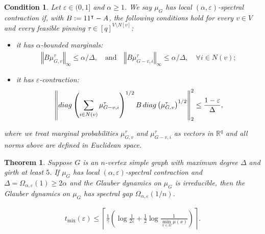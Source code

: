 \documentclass[10pt,a4paper]{amsart}
\newtheorem{theorem}{Theorem}
\newtheorem{condition}{Condition}
\renewcommand{\epsilon}{\varepsilon}
\newcommand{\norm}[1]{\left\Vert#1\right\Vert}
\newcommand{\tp}{\tuple}
\newcommand{\tuple}[1]{\left(#1\right)}
\begin{document}
\begin{condition}\label{cond-local-spectral-contraction}
  Let $\epsilon \in (0,1]$ and $\alpha \geq 1$.
  We say $\mu_G$ has \emph{local $(\alpha,\epsilon)$-spectral contraction} if, with $B := \*1\*1^\intercal - A$, the following conditions hold for every $v \in V$ and every feasible pinning $\tau \in [q]^{V\setminus N[v]}$:
  \begin{itemize}
  \item it has \emph{$\alpha$-bounded marginals}:
    \begin{align*}
      \norm{B\mu^\tau_{G,v}}_{\infty} \leq \alpha/\Delta,
      \quad \text{and} \quad \norm{B\mu^\tau_{G-v,i}}_\infty \leq \alpha/\Delta, \quad \forall i \in N(v);
    \end{align*}
  \item it has \emph{$\epsilon$-contraction}:
    \begin{align*}
        \norm{
        \-{diag}\tp{\sum_{i\in N(v)} \mu^\tau_{G-v,i}}^{1/2}
        B
        \,\-{diag}\tp{\mu^\tau_{G,v}}^{1/2}
        }_{2}^2 \leq \frac{1-\epsilon}{\Delta},
    \end{align*}
  \end{itemize}
  where we treat marginal probabilities $\mu^\tau_{G,v}$ and $\mu^\tau_{G-v,i}$ as vectors in $\mathbb{R}^q$ and all norms above are  defined in Euclidean space.
\end{condition}

\begin{theorem}\label{thm:general}
  Suppose $G$ is an $n$-vertex simple graph with maximum degree $\Delta$ and girth at least $5$.
  If $\mu_G$ has local $(\alpha,\epsilon)$-spectral contraction and $\Delta = \Omega_{\alpha,\epsilon}(1) \geq 2\alpha$ and the Glauber dynamics on $\mu_G$ is irreducible, then the Glauber dynamics on $\mu_G$ has spectral gap $\Omega_{\alpha,\epsilon}(1/n)$.
\end{theorem}

\begin{align}\label{eq:spgap-implies-mixing-time}
  t_{\mathrm{mix}}(\varepsilon)
  \leq\left\lceil\frac1\gamma\left(
    \log\frac1{2\varepsilon}
    +\frac12\log\frac1{\min_{x\in\Omega}\mu(x)}
  \right)\right\rceil.
\end{align}
\end{document}
